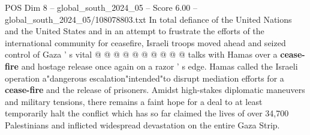 \begin{textsample}{POS Dim 8 – global\_south\_2024\_05 – Score 6.00 – global\_south\_2024\_05/108078803.txt}
In total defiance of the United Nations and the United States and in an attempt to frustrate the efforts of the international community for ceasefire, Israeli troops moved ahead and seized control of Gaza ' s vital @ @ @ @ @ @ @ @ @ @ talks with Hamas over a \textbf{cease-fire} and hostage release once again on a razor ' s edge.
Hamas called the Israeli operation a"dangerous escalation"intended"to disrupt mediation efforts for a \textbf{cease-fire} and the release of prisoners.
Amidst high-stakes diplomatic maneuvers and military tensions, there remains a faint hope for a deal to at least temporarily halt the conflict which has so far claimed the lives of over 34,700 Palestinians and inflicted widespread devastation on the entire Gaza Strip.

\end{textsample}
